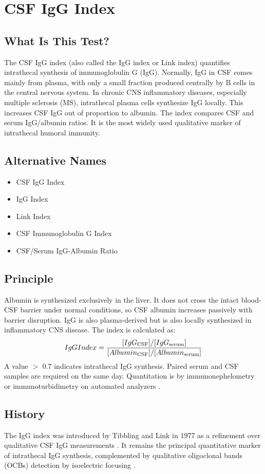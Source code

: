 \chapter{CSF IgG Index}

\section*{What Is This Test?}
The CSF IgG index (also called the IgG index or Link index) quantifies intrathecal synthesis of immunoglobulin G (IgG). Normally, IgG in CSF comes mainly from plasma, with only a small fraction produced centrally by B cells in the central nervous system. In chronic CNS inflammatory diseases, especially multiple sclerosis (MS), intrathecal plasma cells synthesize IgG locally. This increases CSF IgG out of proportion to albumin. The index compares CSF and serum IgG/albumin ratios. It is the most widely used qualitative marker of intrathecal humoral immunity.

\section*{Alternative Names}
\begin{itemize}
  \item CSF IgG Index
  \item IgG Index
  \item Link Index
  \item CSF Immunoglobulin G Index
  \item CSF/Serum IgG-Albumin Ratio
\end{itemize}
\section*{Principle}
Albumin is synthesized exclusively in the liver. It does not cross the intact blood-CSF barrier under normal conditions, so CSF albumin increases passively with barrier disruption. IgG is also plasma-derived but is also locally synthesized in inflammatory CNS disease. The index is calculated as:
\[
IgG Index = \frac{[IgG\textsubscript{\text{CSF}}]/[IgG\textsubscript{\text{serum}}]}{[Albumin\textsubscript{\text{CSF}}]/[Albumin\textsubscript{\text{serum}}]}
\]
A value $>$ 0.7 indicates intrathecal IgG synthesis. Paired serum and CSF samples are required on the same day. Quantitation is by immunonephelometry or immunoturbidimetry on automated analyzers \cite{bonning2020cerebrospinal}.

\section*{History}
The IgG index was introduced by Tibbling and Link in 1977 as a refinement over qualitative CSF IgG measurements \cite{link1977principles}. It remains the principal quantitative marker of intrathecal IgG synthesis, complemented by qualitative oligoclonal bands (OCBs) detection by isoelectric focusing \cite{freedman2005recommended}.

